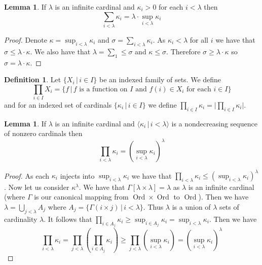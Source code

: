 \documentclass{article}
\theoremstyle{definition}
\newtheorem{defn}[thm]{Definition}
\newtheorem{lmma}[thm]{Lemma}
\DeclareMathOperator{\Ord}{Ord}
\newcommand{\abs}[1]{\lvert#1\rvert}
\begin{document}
\begin{lmma}
    If $\lambda$ is an infinite cardinal and $\kappa_i > 0$ for each $i < \lambda$ then
    \[
        \sum_{i < \lambda} \kappa_i = \lambda \cdot \sup_{i < \lambda} \kappa_i
    \]
\end{lmma}

\begin{proof}
    Denote $\kappa = \sup_{i < \lambda} \kappa_i$ and $\sigma = \sum_{i < \lambda} \kappa_i$. As $\kappa_i < \lambda$ for all $i$ we have that $\sigma \le \lambda \cdot \kappa$. We also have that $\lambda = \sum_{1} \le \sigma$ and $\kappa \le \sigma$. Therefore $\sigma \ge \lambda \cdot \kappa$ so $\sigma = \lambda \cdot \kappa$.
\end{proof}

\begin{defn}
    Let $\{X_i \, | \, i \in I\}$ be an indexed family of sets. We define 
    \[
        \prod_{i \in I} X_i = \{f \, | \, \text{$f$ is a function on $I$ and $f(i) \in X_i$ for each $i \in I$}\}
    \]
    and for an indexed set of cardinals $\{\kappa_i \, | \, i \in I\}$ we define $\prod_{i \in I} \kappa_i = \abs{\prod_{i \in I} \kappa_i}$.
\end{defn}

\begin{lmma}
    If $\lambda$ is an infinite cardinal and $\langle \kappa_i \, | \, i < \lambda \rangle$ is a nondecreasing sequence of nonzero cardinals then 
    \[
        \prod_{i < \lambda} \kappa_i = (\sup_{i < \lambda} \kappa_i)^\lambda
    \]
\end{lmma}

\begin{proof}
    As each $\kappa_i$ injects into $\sup_{i < \lambda} \kappa_i$ we have that $\prod_{i < \lambda} \kappa_i \le (\sup_{i < \lambda} \kappa_i)^\lambda$. Now let us consider $\kappa^\lambda$. We have that $\Gamma[\lambda \times \lambda] = \lambda$ as $\lambda$ is an infinite cardinal (where $\Gamma$ is our canonical mapping from $\Ord \times \Ord$ to $\Ord$). Then we have $\lambda = \bigcup_{j < \lambda} A_j$ where $A_j = \{\Gamma(i \times j) \, | \,i < \lambda\}$. Thus $\lambda$ is a union of $\lambda$ sets of cardinality $\lambda$. It follows that $\prod_{i \in A_j} \kappa_i \ge \sup_{i \in A_j} \kappa_i = \sup_{i < \lambda} \kappa_i$. Then we have 
    \[
        \prod_{i < \lambda} \kappa_i = \prod_{j < \lambda} (\prod_{i \in A_j} \kappa_i) \ge \prod_{j < \lambda} (\sup_{i < \lambda} \kappa_i) = (\sup_{i < \lambda} \kappa_i)^\lambda
    \]
\end{proof}
\end{document}
